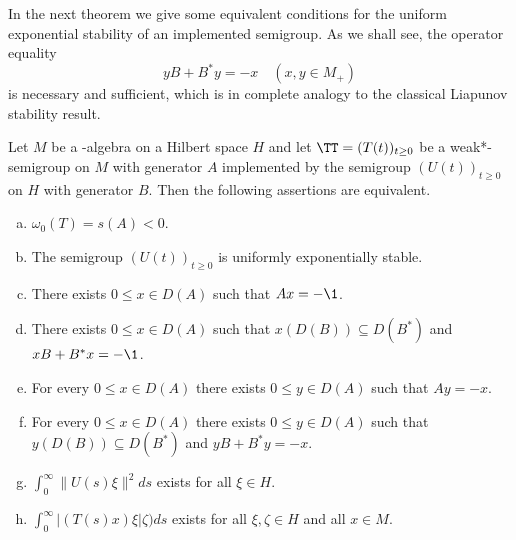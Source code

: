 In the next theorem we give some equivalent conditions for the uniform exponential stability of an implemented semigroup.
As we shall see, the operator equality
\[
yB + B^{*}y = -x \quad (x, y \in M_{+})
\]
is necessary and sufficient, which is in complete analogy to the classical Liapunov stability result.
\begin{theorem}\label{thm:d4-2.2}
Let $M$ be a \WA-algebra on a Hilbert space $H$ and let $\TT = (T(t))_{t \geq 0}$ be a weak*-semigroup on $M$ with generator $A$ implemented by the semigroup $(U(t))_{t \geq 0}$ on $H$ with generator $B$.
Then the following assertions are equivalent.
\begin{enumerate}[(a)]

\item\label{item:d4-2.2-a}
$\omega_{0}(T) = s(A) < 0$.

\item\label{item:d4-2.2-b}
The semigroup $(U(t))_{t \geq 0}$ is uniformly exponentially stable.

\item\label{item:d4-2.2-c}
There exists $0 \leq x \in D(A)$ such that $Ax = -\1$.

\item\label{item:d4-2.2-d}
There exists $0 \leq x \in D(A)$ such that $x(D(B)) \subseteq D(B^{*})$ \mbox{and $xB+B^{*}x = -\1$}.

\item\label{item:d4-2.2-e}
For every $0 \leq x \in D(A)$ there exists $0 \leq y \in D(A)$ such that $Ay = -x$.

\item\label{item:d4-2.2-f}
For every $0 \leq x \in D(A)$ there exists $0 \leq y \in D(A)$ such that $y(D(B)) \subseteq D(B^{*})$ and $yB+B^{*}y = -x$.

\item\label{item:d4-2.2-g}
$\int_{0}^{\infty} \|U(s)\xi\|^2ds$ exists for all $\xi \in H$.

\item\label{item:d4-2.2-h}
$\int_{0}^{\infty} |(T(s)x)\xi|\zeta)ds$ exists for all $\xi,\zeta \in H$ and all $x \in M$.
\end{enumerate}
\end{theorem}

